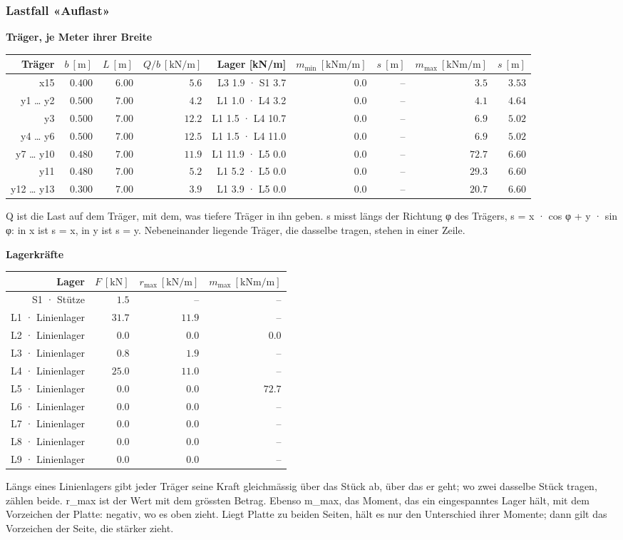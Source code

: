 \documentclass[11pt,a4paper]{article}
\begin{document}
\subsubsection{Lastfall «Auflast»}
\noindent\textbf{Träger, je Meter ihrer Breite}
\begin{longtable}{rrrrrrrrr}
\hline
Träger & $b\ [\mathrm{m}]$ & $L\ [\mathrm{m}]$ & $Q/b\ [\mathrm{kN/m}]$ & Lager [kN/m] & $m_{\min}\ [\mathrm{kNm/m}]$ & $s\ [\mathrm{m}]$ & $m_{\max}\ [\mathrm{kNm/m}]$ & $s\ [\mathrm{m}]$ \\
\hline
\endhead
x15 & $0.400$ & $6.00$ & $5.6$ & L3 1.9 · S1 3.7 & $0.0$ & – & $3.5$ & $3.53$ \\
y1 … y2 & $0.500$ & $7.00$ & $4.2$ & L1 1.0 · L4 3.2 & $0.0$ & – & $4.1$ & $4.64$ \\
y3 & $0.500$ & $7.00$ & $12.2$ & L1 1.5 · L4 10.7 & $0.0$ & – & $6.9$ & $5.02$ \\
y4 … y6 & $0.500$ & $7.00$ & $12.5$ & L1 1.5 · L4 11.0 & $0.0$ & – & $6.9$ & $5.02$ \\
y7 … y10 & $0.480$ & $7.00$ & $11.9$ & L1 11.9 · L5 0.0 & $0.0$ & – & $72.7$ & $6.60$ \\
y11 & $0.480$ & $7.00$ & $5.2$ & L1 5.2 · L5 0.0 & $0.0$ & – & $29.3$ & $6.60$ \\
y12 … y13 & $0.300$ & $7.00$ & $3.9$ & L1 3.9 · L5 0.0 & $0.0$ & – & $20.7$ & $6.60$ \\
\hline
\end{longtable}
Q ist die Last auf dem Träger, mit dem, was tiefere Träger in ihn geben. s misst längs der Richtung φ des Trägers, s = x · cos φ + y · sin φ: in x ist s = x, in y ist s = y. Nebeneinander liegende Träger, die dasselbe tragen, stehen in einer Zeile.

\noindent\textbf{Lagerkräfte}
\begin{longtable}{rrrr}
\hline
Lager & $F\ [\mathrm{kN}]$ & $r_{\max}\ [\mathrm{kN/m}]$ & $m_{\max}\ [\mathrm{kNm/m}]$ \\
\hline
\endhead
S1 · Stütze & $1.5$ & – & – \\
L1 · Linienlager & $31.7$ & $11.9$ & – \\
L2 · Linienlager & $0.0$ & $0.0$ & $0.0$ \\
L3 · Linienlager & $0.8$ & $1.9$ & – \\
L4 · Linienlager & $25.0$ & $11.0$ & – \\
L5 · Linienlager & $0.0$ & $0.0$ & $72.7$ \\
L6 · Linienlager & $0.0$ & $0.0$ & – \\
L7 · Linienlager & $0.0$ & $0.0$ & – \\
L8 · Linienlager & $0.0$ & $0.0$ & – \\
L9 · Linienlager & $0.0$ & $0.0$ & – \\
\hline
\end{longtable}
Längs eines Linienlagers gibt jeder Träger seine Kraft gleichmässig über das Stück ab, über das er geht; wo zwei dasselbe Stück tragen, zählen beide. r\_max ist der Wert mit dem grössten Betrag. Ebenso m\_max, das Moment, das ein eingespanntes Lager hält, mit dem Vorzeichen der Platte: negativ, wo es oben zieht. Liegt Platte zu beiden Seiten, hält es nur den Unterschied ihrer Momente; dann gilt das Vorzeichen der Seite, die stärker zieht.
\end{document}
